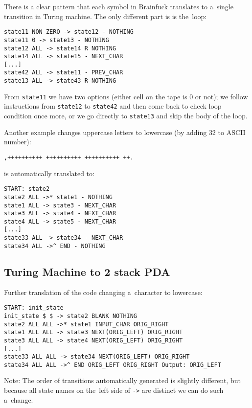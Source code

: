 \documentclass[english,shortabstract,mgr]{iithesis}
\begin{document}
There is a clear pattern that each symbol in Brainfuck translates
to a~single transition in Turing machine. The only different part is
is the~loop:
\begin{verbatim}
state11 NON_ZERO -> state12 - NOTHING
state11 0 -> state13 - NOTHING
state12 ALL -> state14 R NOTHING
state14 ALL -> state15 - NEXT_CHAR
[...]
state42 ALL -> state11 - PREV_CHAR
state13 ALL -> state43 R NOTHING
\end{verbatim}

From \texttt{state11} we have two options (either cell on the tape is $0$
or not); we follow instructions from \texttt{state12} to \texttt{state42}
and then come back to check loop condition once more, or we go directly
to \texttt{state13} and skip the body of the loop.

Another example changes uppercase letters to lowercase (by adding $32$
to ASCII number):

\begin{verbatim}
,++++++++++ ++++++++++ ++++++++++ ++.
\end{verbatim}

is automatically translated to:

\begin{verbatim}
START: state2
state2 ALL ->* state1 - NOTHING
state1 ALL -> state3 - NEXT_CHAR
state3 ALL -> state4 - NEXT_CHAR
state4 ALL -> state5 - NEXT_CHAR
[...]
state33 ALL -> state34 - NEXT_CHAR
state34 ALL ->^ END - NOTHING
\end{verbatim}

\subsection{Turing Machine to 2 stack PDA}

Further translation of the code changing a~character to lowercase:

\begin{verbatim}
START: init_state
init_state $ $ -> state2 BLANK NOTHING
state2 ALL ALL ->* state1 INPUT_CHAR ORIG_RIGHT
state1 ALL ALL -> state3 NEXT(ORIG_LEFT) ORIG_RIGHT
state3 ALL ALL -> state4 NEXT(ORIG_LEFT) ORIG_RIGHT
[...]
state33 ALL ALL -> state34 NEXT(ORIG_LEFT) ORIG_RIGHT
state34 ALL ALL ->^ END ORIG_LEFT ORIG_RIGHT Output: ORIG_LEFT
\end{verbatim}

Note: The order of transitions automatically generated is slightly different,
but because all state names on the~left side of \texttt{->} are distinct
we can do such a~change.
\end{document}
